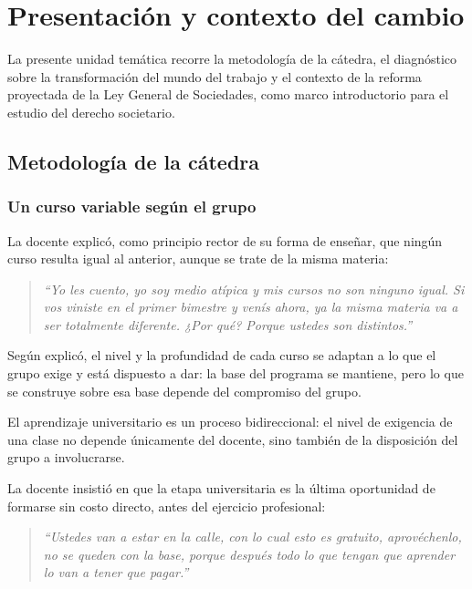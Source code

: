 \documentclass[12pt,oneside]{book}
\begin{document}
\chapter[Presentación y contexto del cambio]{Presentación y contexto del cambio}

\begin{note}
La presente unidad temática recorre la metodología de la cátedra, el diagnóstico sobre la transformación del mundo del trabajo y el contexto de la reforma proyectada de la Ley General de Sociedades, como marco introductorio para el estudio del derecho societario.
\end{note}

\section{Metodología de la cátedra}

\subsection{Un curso variable según el grupo}

La docente explicó, como principio rector de su forma de enseñar, que ningún curso resulta igual al anterior, aunque se trate de la misma materia:

\begin{quote}
\textit{``Yo les cuento, yo soy medio atípica y mis cursos no son ninguno igual. Si vos viniste en el primer bimestre y venís ahora, ya la misma materia va a ser totalmente diferente. ¿Por qué? Porque ustedes son distintos.''}
\end{quote}

Según explicó, el nivel y la profundidad de cada curso se adaptan a lo que el grupo exige y está dispuesto a dar: la base del programa se mantiene, pero lo que se construye sobre esa base depende del compromiso del grupo.

\begin{important}
El aprendizaje universitario es un proceso bidireccional: el nivel de exigencia de una clase no depende únicamente del docente, sino también de la disposición del grupo a involucrarse.
\end{important}

La docente insistió en que la etapa universitaria es la última oportunidad de formarse sin costo directo, antes del ejercicio profesional:

\begin{quote}
\textit{``Ustedes van a estar en la calle, con lo cual esto es gratuito, aprovéchenlo, no se queden con la base, porque después todo lo que tengan que aprender lo van a tener que pagar.''}
\end{quote}
\end{document}
